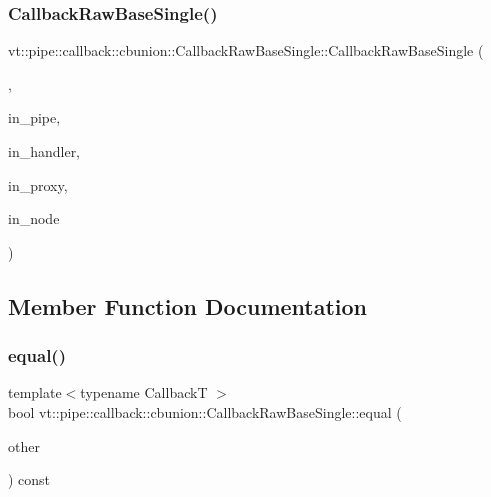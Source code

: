 \subsubsection{\texorpdfstring{Callback\+Raw\+Base\+Single()}{CallbackRawBaseSingle()}\hspace{0.1cm}{\footnotesize\ttfamily [13/13]}}
{\footnotesize\ttfamily vt\+::pipe\+::callback\+::cbunion\+::\+Callback\+Raw\+Base\+Single\+::\+Callback\+Raw\+Base\+Single (\begin{DoxyParamCaption}\item[{Raw\+Send\+Obj\+Grp\+Tag\+Type}]{,  }\item[{\hyperlink{namespacevt_ac9852acda74d1896f48f406cd72c7bd3}{Pipe\+Type}}]{in\+\_\+pipe,  }\item[{\hyperlink{namespacevt_af64846b57dfcaf104da3ef6967917573}{Handler\+Type}}]{in\+\_\+handler,  }\item[{\hyperlink{namespacevt_ad7cae989df485fccca57f0792a880a8e}{Obj\+Group\+Proxy\+Type}}]{in\+\_\+proxy,  }\item[{\hyperlink{namespacevt_a866da9d0efc19c0a1ce79e9e492f47e2}{Node\+Type}}]{in\+\_\+node }\end{DoxyParamCaption})}



\subsection{Member Function Documentation}
\mbox{\label{structvt_1_1pipe_1_1callback_1_1cbunion_1_1_callback_raw_base_single_a5a2b870d980afbeb12ff2b708028cddc}} 
\subsubsection{\texorpdfstring{equal()}{equal()}}
{\footnotesize\ttfamily template$<$typename CallbackT $>$ \\
bool vt\+::pipe\+::callback\+::cbunion\+::\+Callback\+Raw\+Base\+Single\+::equal (\begin{DoxyParamCaption}\item[{CallbackT const \&}]{other }\end{DoxyParamCaption}) const\hspace{0.3cm}{\ttfamily [inline]}}

